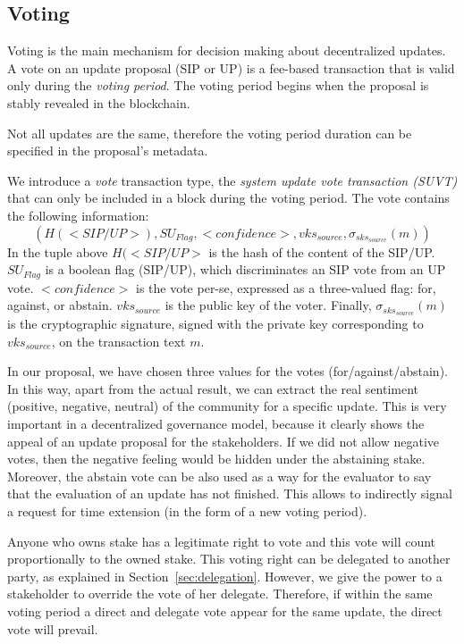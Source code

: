 \documentclass[11pt,a4paper]{article}
\begin{document}
\subsection{Voting}
\label{sec:voting}

Voting is the main mechanism for decision making about decentralized updates. A
vote on an update proposal (SIP or UP) is a fee-based transaction that is valid
only during the \emph{voting period}.
%
The voting period begins when the proposal is stably revealed in the blockchain.

Not all updates are the same, therefore the voting period duration can be
specified in the proposal's metadata.

We introduce a \emph{vote} transaction type, the \emph{system update vote
  transaction (SUVT)} that can only be included in a block during the voting
period. The vote contains the following information:
$$( H(<SIP/UP>),SU_{Flag},<confidence>,vks_{source},\sigma_{sks_{source}}(m))$$
In the tuple above $H(<SIP/UP>$ is the hash of the content of the SIP/UP.
$SU_{Flag}$ is a boolean flag (SIP/UP), which discriminates an SIP vote from an
UP vote. $<confidence>$ is the vote per-se, expressed as a three-valued flag:
for, against, or abstain. $vks_{source}$ is the public key of the voter.
Finally, $\sigma_{sks_{source}}(m)$ is the cryptographic signature, signed with
the private key corresponding to $vks_{source}$, on the transaction text $m$.

In our proposal, we have chosen three values for the votes
(for/against/abstain). In this way, apart from the actual result, we can extract
the real sentiment (positive, negative, neutral) of the community for a specific
update. This is very important in a decentralized governance model, because it
clearly shows the appeal of an update proposal for the stakeholders. If we did
not allow negative votes, then the negative feeling would be hidden under the
abstaining stake.
%
Moreover, the abstain vote can be also used as a way for the evaluator to say
that the evaluation of an update has not finished. This allows to indirectly
signal a request for time extension (in the form of a new voting period).

Anyone who owns stake has a legitimate right to vote and this vote will count
proportionally to the owned stake. This voting right can be delegated to another
party, as explained in Section~\ref{sec:delegation}. However, we give the power
to a stakeholder to override the vote of her delegate. Therefore, if within the
same voting period a direct and delegate vote appear for the same update, the
direct vote will prevail.
\end{document}
